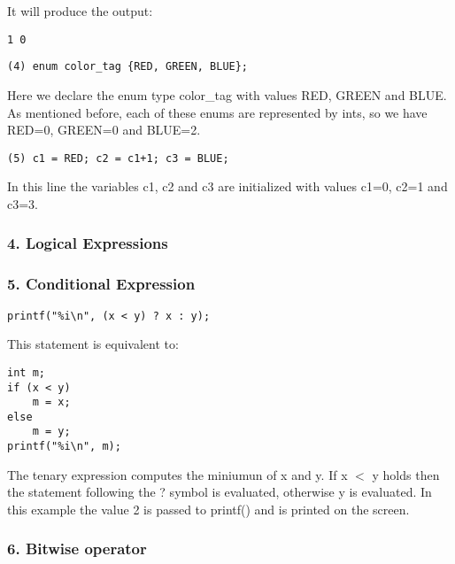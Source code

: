 \documentclass[12pt]{article}
\begin{document}
It will produce the output:
\begin{lstlisting}
1 0
\end{lstlisting}

\begin{lstlisting}
(4) enum color_tag {RED, GREEN, BLUE};
\end{lstlisting}

Here we declare the enum type color\_tag with values RED, GREEN and BLUE. As mentioned before, each of these enums are represented by ints, so we have RED=0, GREEN=0 and BLUE=2.

\begin{lstlisting}
(5) c1 = RED; c2 = c1+1; c3 = BLUE;
\end{lstlisting}
In this line the variables c1, c2 and c3 are initialized with values c1=0, c2=1 and c3=3.


\subsubsection*{4. Logical Expressions}

\subsubsection*{5. Conditional Expression}
\begin{lstlisting}
printf("%i\n", (x < y) ? x : y);
\end{lstlisting}
This statement is equivalent to:
\begin{lstlisting}
int m;
if (x < y)
	m = x;
else 
	m = y;
printf("%i\n", m);
\end{lstlisting}
The tenary expression computes the miniumun of x and y. If x $<$ y holds then the statement following the ? symbol is evaluated, otherwise y is evaluated. In this example the value 2 is passed to printf() and is printed on the screen.

\subsubsection*{6. Bitwise operator}
\end{document}
